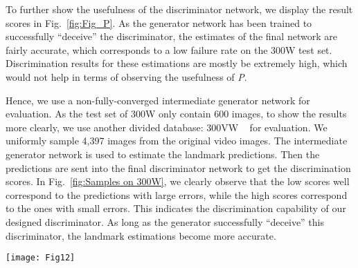 \documentclass[10pt,journal,compsoc]{IEEEtran}
\begin{document}
To further show the usefulness of the discriminator network, we display the result scores in Fig.~\ref{fig:Fig_P}.
As the generator network has been trained to successfully ``deceive''  the discriminator,
the estimates of the final network are fairly accurate, which corresponds to a low failure rate on the 300W test set.
Discrimination results for these estimations are mostly be extremely high, which would not help in terms of
observing the usefulness of \textit{P}.

Hence, we use a non-fully-converged intermediate generator network for evaluation.
As the test set of 300W only contain 600 images, to show the results more clearly, we use another divided database: 300VW ~\cite{chrysos2015offline,shen2015first,tzimiropoulos2015project} for evaluation.
We uniformly sample 4,397 images from the original video images.
The intermediate generator network is used to estimate the landmark predictions.
Then the predictions are sent into the final discriminator network to get the discrimination scores.
In Fig.~\ref{fig:Samples on 300W}, we clearly observe  that the low scores well correspond to the predictions with large errors, while the high scores correspond to the ones with small errors.
This indicates the discrimination capability of our  designed discriminator.
As long as the generator successfully ``deceive''
this discriminator, the landmark estimations become more accurate.



\begin{figure*}[!t]
\centering
\texttt{[image: Fig12]}
%
\caption{Samples on the 300W test set. The four rows are results of MDM \cite{trigeorgis2016mnemonic}, CFSS
\cite{zhu2015face}, SDM\cite{xiong2013supervised} and our method respectively. After estimation by each method, the coordinates are projected to the original image. Then the images are cropped to make sure that all the estimated landmarks are within the displayed image, which results in different scales of the displayed images. }
\label{fig:Samples on 300W}
\end{figure*}


\def\etal{{\it et al.}}
\end{document}
